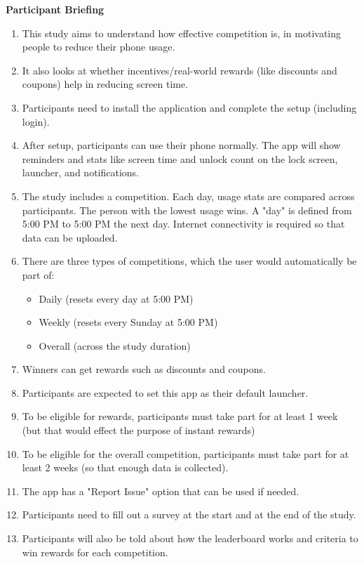 \documentclass{article}
\begin{document}
\textbf{Participant Briefing}
\begin{enumerate}
    \item This study aims to understand how effective competition is, in motivating people to reduce their phone usage.
    \item It also looks at whether incentives/real-world rewards (like discounts and coupons) help in reducing screen time.
    \item Participants need to install the application and complete the setup (including login).
    \item After setup, participants can use their phone normally. The app will show reminders and stats like screen time and unlock count on the lock screen, launcher, and notifications.
    \item The study includes a competition. Each day, usage stats are compared across participants. The person with the lowest usage wins. A "day" is defined from 5:00 PM to 5:00 PM the next day. Internet connectivity is required so that data can be uploaded.
    \item There are three types of competitions, which the user would automatically be part of:
    \begin{itemize}
        \item Daily (resets every day at 5:00 PM)
        \item Weekly (resets every Sunday at 5:00 PM)
        \item Overall (across the study duration)
    \end{itemize}
    \item Winners can get rewards such as discounts and coupons.
    \item Participants are expected to set this app as their default launcher.
    \item To be eligible for rewards, participants must take part for at least 1 week (but that would effect the purpose of instant rewards)
    \item To be eligible for the overall competition, participants must take part for at least 2 weeks (so that enough data is collected).
    \item The app has a "Report Issue" option that can be used if needed.
    \item Participants need to fill out a survey at the start and at the end of the study.
    \item Participants will also be told about how the leaderboard works and criteria to win rewards for each competition.
\end{enumerate}
\end{document}

